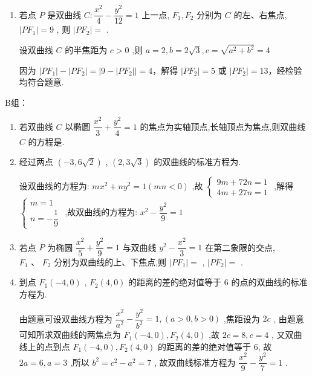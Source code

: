 \begin{enumerate}
    \item 若点 $P$ 是双曲线 $C : \dfrac{{x}^{2}}{4} - \dfrac{{y}^{2}}{12} = 1$ 上一点, ${F}_{1},{F}_{2}$ 分别为 $C$ 的左、右焦点, $\left| {P{F}_{1}}\right|  = 9$ , 则 $\left| {P{F}_{2}}\right|  =$ .
    \begin{jieda}
        设双曲线 $C$ 的半焦距为 $c > 0$ ,则 $a = 2,b = 2\sqrt{3},c = \sqrt{{a}^{2} + {b}^{2}} = 4$
        
        因为 $\left|{P{F}_{1}}\right| - \left|{P{F}_{2}}\right| = \left| {9 - \left|{P{F}_{2}}\right|}\right|  = 4$，解得 $\left| {P{F}_{2}}\right|  = 5$ 或 $\left| {P{F}_{2}}\right|  = {13}$，经检验均符合题意.
    \end{jieda}
\end{enumerate}

B组：
\begin{enumerate}
    \item 若双曲线 $C$ 以椭圆 $\dfrac{{x}^{2}}{3} + \dfrac{{y}^{2}}{4} = 1$ 的焦点为实轴顶点,长轴顶点为焦点,则双曲线 $C$ 的方程是.
    
    \item 经过两点 $\left( {-3,6\sqrt{2}}\right)$ , $\left( {2,3\sqrt{3}}\right)$ 的双曲线的标准方程为.
    \begin{jieda}
        设双曲线的方程为: $m{x}^{2} + n{y}^{2} = 1\left( {{mn} < 0}\right)$ ,故 $\left\{  \begin{array}{l} {9m} + {72n} = 1 \\  {4m} + {27n} = 1 \end{array}\right.$ ,解得 $\left\{  \begin{array}{l} m = 1 \\  n =  - \dfrac{1}{9} \end{array}\right.$ ,故双曲线的方程为: ${x}^{2} - \dfrac{{y}^{2}}{9} = 1$
    \end{jieda}

    \item 若点 $P$ 为椭圆 $\dfrac{{x}^{2}}{5} + \dfrac{{y}^{2}}{9} = 1$ 与双曲线 ${y}^{2} - \dfrac{{x}^{2}}{3} = 1$ 在第二象限的交点, ${F}_{1}\text{ 、 }{F}_{2}$ 分别为双曲线的上、下焦点,则 $\left| {P{F}_{1}}\right|  =$ , $\left| {P{F}_{2}}\right|  =$ .

    \item 到点 ${F}_{1}\left( {-4,0}\right)$ , ${F}_{2}\left( {4,0}\right)$ 的距离的差的绝对值等于 6 的点的双曲线的标准方程为.
    \begin{jieda}
        由题意可设双曲线方程为 $\dfrac{{x}^{2}}{{a}^{2}} - \dfrac{{y}^{2}}{{b}^{2}} = 1,\left( {a > 0,b > 0}\right)$ ,焦距设为 ${2c}$ , 由题意可知所求双曲线的两焦点为 ${F}_{1}\left( {-4,0}\right) ,{F}_{2}\left( {4,0}\right)$ ,故 ${2c} = 8,c = 4$ , 又双曲线上的点到点 ${F}_{1}\left( {-4,0}\right) ,{F}_{2}\left( {4,0}\right)$ 的距离的差的绝对值等于 6, 故 ${2a} = 6,a = 3$ ,所以 ${b}^{2} = {c}^{2} - {a}^{2} = 7$ , 故双曲线标准方程为 $\dfrac{{x}^{2}}{9} - \dfrac{{y}^{2}}{7} = 1$ . 
    \end{jieda}


\end{enumerate}
